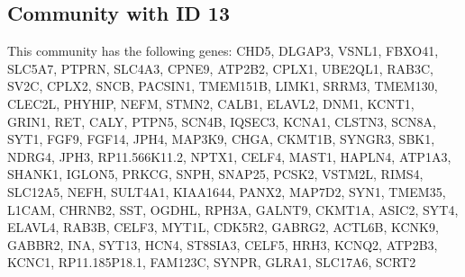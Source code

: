 \subsection*{Community with ID 13}
This community has the following genes: CHD5, DLGAP3, VSNL1, FBXO41, SLC5A7, PTPRN, SLC4A3, CPNE9, ATP2B2, CPLX1, UBE2QL1, RAB3C, SV2C, CPLX2, SNCB, PACSIN1, TMEM151B, LIMK1, SRRM3, TMEM130, CLEC2L, PHYHIP, NEFM, STMN2, CALB1, ELAVL2, DNM1, KCNT1, GRIN1, RET, CALY, PTPN5, SCN4B, IQSEC3, KCNA1, CLSTN3, SCN8A, SYT1, FGF9, FGF14, JPH4, MAP3K9, CHGA, CKMT1B, SYNGR3, SBK1, NDRG4, JPH3, RP11.566K11.2, NPTX1, CELF4, MAST1, HAPLN4, ATP1A3, SHANK1, IGLON5, PRKCG, SNPH, SNAP25, PCSK2, VSTM2L, RIMS4, SLC12A5, NEFH, SULT4A1, KIAA1644, PANX2, MAP7D2, SYN1, TMEM35, L1CAM, CHRNB2, SST, OGDHL, RPH3A, GALNT9, CKMT1A, ASIC2, SYT4, ELAVL4, RAB3B, CELF3, MYT1L, CDK5R2, GABRG2, ACTL6B, KCNK9, GABBR2, INA, SYT13, HCN4, ST8SIA3, CELF5, HRH3, KCNQ2, ATP2B3, KCNC1, RP11.185P18.1, FAM123C, SYNPR, GLRA1, SLC17A6, SCRT2
\\
